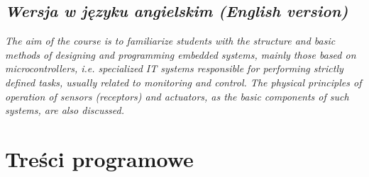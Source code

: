 \documentclass[12pt, a4paper]{article}
\begin{document}
\subsection*{\textit{Wersja w języku angielskim (English version)}}

\textit{The aim of the course is to familiarize students with the structure and basic methods of designing and programming embedded systems, mainly those based on microcontrollers, i.e. specialized IT systems responsible for performing strictly defined tasks, usually related to monitoring and control. The physical principles of operation of sensors (receptors) and actuators, as the basic components of such systems, are also discussed.}


\section{Treści programowe}
\end{document}
